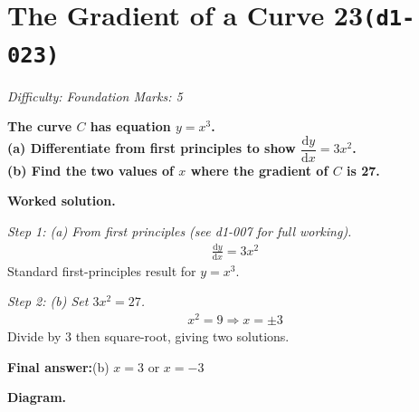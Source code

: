 \documentclass[11pt]{article}
\newcommand{\question}[1]{\par\medskip\noindent\textbf{#1}\par}
\begin{document}
\section*{The Gradient of a Curve 23\quad\small\texttt{(d1-023)}}
\textit{Difficulty: Foundation \quad\textbar\quad Marks: 5}

\question{The curve \( C \) has equation \( y = x^3 \).\\[3pt]  (a) Differentiate from first principles to show \( \dfrac{\mathrm{d}y}{\mathrm{d}x} = 3x^2 \).\\[3pt]  (b) Find the two values of \( x \) where the gradient of \( C \) is 27.}

\textbf{Worked solution.}

\textit{Step 1: (a) From first principles (see d1-007 for full working).}
\[\begin{gathered}
\frac{\mathrm{d}y}{\mathrm{d}x} = 3x^2
\end{gathered}\]
Standard first-principles result for \( y = x^3 \).

\textit{Step 2: (b) Set \( 3x^2 = 27 \).}
\[\begin{gathered}
x^2 = 9 \Rightarrow x = \pm 3
\end{gathered}\]
Divide by 3 then square-root, giving two solutions.

\begin{answerbox}
\textbf{Final answer:}\quad (b) \(\displaystyle  x = 3 \) or \(\displaystyle  x = -3 \)
\end{answerbox}
\textbf{Diagram.}
\end{document}

